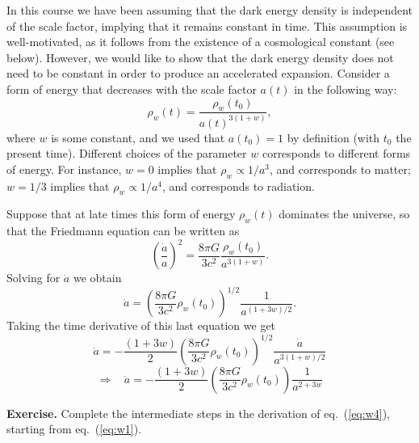 \documentclass[11pt, a4paper,oneside,openright]{book}
\numberwithin{equation}{section}
\begin{document}
In this course we have been assuming that the dark energy density is independent of the scale factor, implying that it remains constant in time. This assumption is well-motivated, as it follows from the existence of a cosmological constant (see below). However, we would like to show that the dark energy density does not need to be constant in order to produce an accelerated expansion. Consider a form of energy that decreases with the scale factor $a(t)$ in the following way:
\begin{equation} \label{eq:w0}
\rho_w(t)=\frac{\rho_w(t_0)}{a(t)^{3(1+w)}},
\end{equation}
where $w$ is some constant, and we used that $a(t_0)=1$ by definition (with $t_0$ the present time). Different choices of the parameter $w$ corresponds to different forms of energy. For instance, $w=0$ implies that $\rho_w\propto 1/a^3$, and corresponds to matter; $w=1/3$ implies that $\rho_w\propto 1/a^4$, and corresponds to radiation.

Suppose that at late times this form of energy $\rho_w(t)$ dominates the universe, so that the Friedmann equation can be written as
\begin{equation} \label{eq:w1}
\left(\frac{\dot{a}}{a}\right)^2= \frac{8\pi G}{3c^2}\frac{\rho_w(t_0)}{a^{3(1+w)}}.
\end{equation}
Solving for $\dot{a}$ we obtain
\begin{equation} \label{eq:w2}
\dot{a}=\left(\frac{8\pi G}{3c^2}\rho_w(t_0)\right)^{1/2} \frac{1}{a^{(1+3w)/2}}.
\end{equation}
Taking the time derivative of this last equation we get
\begin{equation} \label{eq:w3}
\ddot{a}=-\frac{(1+3w)}{2}\left(\frac{8\pi G}{3c^2}\rho_w(t_0)\right)^{1/2} \frac{\dot{a}}{a^{3(1+w)/2}}
\end{equation}
\begin{equation} \label{eq:w4}
\Rightarrow~~~~ \ddot{a}=-\frac{(1+3w)}{2}\left(\frac{8\pi G}{3c^2}\rho_w(t_0)\right) \frac{1}{a^{2+3w}}
\end{equation}

\par\vspace{\baselineskip}

{\bf Exercise.} Complete the intermediate steps in the derivation of eq.\ (\ref{eq:w4}), starting from eq.\ (\ref{eq:w1}).

\par\vspace{\baselineskip}
\end{document}
